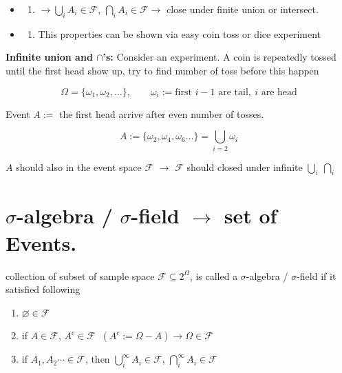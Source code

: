 \documentclass[
  letterpaper,
  DIV=11,
  numbers=noendperiod]{scrreprt}
\providecommand{\tightlist}{%
  \setlength{\itemsep}{0pt}\setlength{\parskip}{0pt}}
\theoremstyle{definition}
\theoremstyle{plain}
\theoremstyle{plain}
\theoremstyle{definition}
\theoremstyle{plain}
\theoremstyle{plain}
\theoremstyle{remark}
\begin{document}
\begin{itemize}
\tightlist
\item
  \begin{enumerate}
  \def\labelenumi{(\alph{enumi})}
  \tightlist
  \item
    \(\to \bigcup_i A_i \in \mathcal{F}\),
    \(\bigcap_i A_i \in \mathcal{F} \to\) close under finite union or
    intersect.
  \end{enumerate}
\item
  \begin{enumerate}
  \def\labelenumi{(\alph{enumi})}
  \setcounter{enumi}{1}
  \tightlist
  \item
    This properties can be shown via easy coin toss or dice experiment
  \end{enumerate}
\end{itemize}

\textbf{Infinite union and \(\cap\)'s:} Consider an experiment. A coin
is repeatedly tossed until the first head show up, try to find number of
toss before this happen

\[
\Omega = \{\omega_1, \omega_2, \dots\}, \qquad \omega_i := \text{first } i{-}1 \text{ are tail}, \ i \text{ are head}
\]

Event \(A :=\) the first head arrive after even number of tosses.

\[
A := \{\omega_2, \omega_4, \omega_6 \dots\} = \bigcup_{i=2} \omega_i
\]

\(A\) should also in the event space \(\mathcal{F}\) \(\to\)
\(\mathcal{F}\) should closed under infinite \(\bigcup_i \ \bigcap_i\)

\section{\texorpdfstring{\(\sigma\)-algebra / \(\sigma\)-field \(\to\)
set of
Events.}{\textbackslash sigma-algebra / \textbackslash sigma-field \textbackslash to set of Events.}}\label{sigma-algebra-sigma-field-to-set-of-events.}

collection of subset of sample space \(\mathcal{F} \subseteq 2^\Omega\),
is called a \(\sigma\)-algebra / \(\sigma\)-field if it satisfied
following

\begin{enumerate}
\def\labelenumi{\arabic{enumi}.}
\tightlist
\item
  \(\varnothing \in \mathcal{F}\)
\item
  if \(A \in \mathcal{F}\), \(A^c \in \mathcal{F}\)
  \(\ (A^c := \Omega - A) \to \Omega \in \mathcal{F}\)
\item
  if \(A_1, A_2 \cdots \in \mathcal{F}\), then
  \(\bigcup_i^\infty A_i \in \mathcal{F}\),
  \(\bigcap_i^\infty A_i \in \mathcal{F}\)
\end{enumerate}
\end{document}
